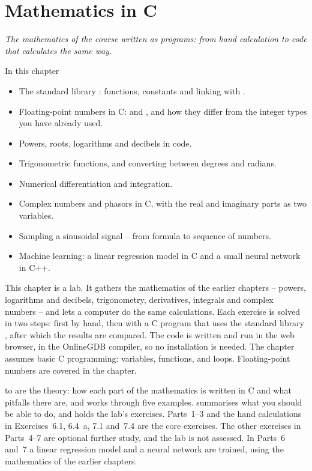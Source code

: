 
\chapter{Mathematics in C}
\label{c18:ch}

{\large\itshape The mathematics of the course written as programs: from hand calculation to code
that calculates the same way.\par}

\begin{chapterbox}{In this chapter}
\begin{itemize}
  \item The standard library : functions, constants and linking with .
  \item Floating-point numbers in C:  and , and how they differ from the
    integer types you have already used.
  \item Powers, roots, logarithms and decibels in code.
  \item Trigonometric functions, and converting between degrees and radians.
  \item Numerical differentiation and integration.
  \item Complex numbers and phasors in C, with the real and imaginary parts as two variables.
  \item Sampling a sinusoidal signal -- from formula to sequence of numbers.
  \item Machine learning: a linear regression model in C and a small neural network in C++.
\end{itemize}
\end{chapterbox}

This chapter is a lab. It gathers the mathematics of the earlier chapters -- powers, logarithms
and decibels, trigonometry, derivatives, integrals and complex numbers -- and lets a computer do
the same calculations. Each exercise is solved in two steps: first by hand, then with a C program
that uses the standard library , after which the results are
compared. The code is written and run in the web browser, in the OnlineGDB compiler, so no
installation is needed. The chapter assumes basic C programming: variables, functions,
 and loops. Floating-point numbers are covered in the chapter.

 to  are the theory: how each part of the
mathematics is written in C and what pitfalls there are, and  works
through five examples.  summarises what you should be able to do,
and  holds the lab's exercises. Parts~1--3 and the hand calculations in
Exercises~6.1, 6.4~a, 7.1 and~7.4 are the core exercises. The other exercises in Parts~4--7 are
optional further study, and the lab is not assessed. In Parts~6 and~7 a linear regression model and a neural network are trained, using
the mathematics of the earlier chapters.

